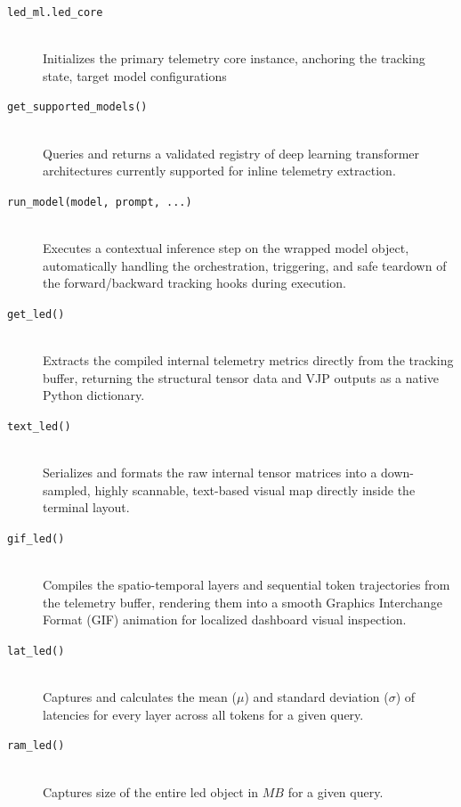 \documentclass[10pt,conference]{IEEEtran}
\begin{document}
\begin{description}
    \item[\texttt{led\_ml.led\_core}] \hfill \\
    Initializes the primary telemetry core instance, anchoring the tracking state, target model configurations
    
    \item[\texttt{get\_supported\_models()}] \hfill \\
    Queries and returns a validated registry of deep learning transformer architectures currently supported for inline telemetry extraction.
    
    \item[\texttt{run\_model(model, prompt, ...)}] \hfill \\
    Executes a contextual inference step on the wrapped model object, automatically handling the orchestration, triggering, and safe teardown of the forward/backward tracking hooks during execution.
    
    \item[\texttt{get\_led()}] \hfill \\
    Extracts the compiled internal telemetry metrics directly from the tracking buffer, returning the structural tensor data and VJP outputs as a native Python dictionary.
    
    \item[\texttt{text\_led()}] \hfill \\
    Serializes and formats the raw internal tensor matrices into a down-sampled, highly scannable, text-based visual map directly inside the terminal layout.
    
    \item[\texttt{gif\_led()}] \hfill \\
    Compiles the spatio-temporal layers and sequential token trajectories from the telemetry buffer, rendering them into a smooth Graphics Interchange Format (GIF) animation for localized dashboard visual inspection.

    \item[\texttt{lat\_led()}] \hfill \\
    Captures and calculates the mean ($\mu$) and standard deviation ($\sigma$) of latencies for every layer across all tokens for a given query.

    \item[\texttt{ram\_led()}] \hfill \\
    Captures size of the entire led object in $MB$ for a given query.

\end{description}
\end{document}
